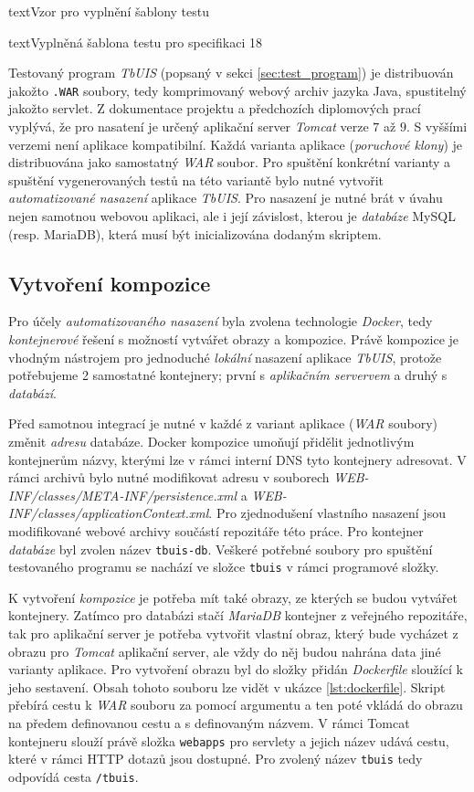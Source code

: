\documentclass[czech, ma, kiv, he, iso690numb, pdf, viewonly]{fasthesis}
\begin{document}
\begin{code}{text}{Vzor pro vyplnění šablony testu \label{lst:template}}
{\begin{code}{text}{Vyplněná šablona testu pro specifikaci 18 \label{lst:spec18}}
{    %
    Testovaný program \textit{TbUIS} (popsaný v sekci \ref{sec:test_program}) je distribuován jakožto \verb|.WAR| soubory, tedy komprimovaný webový archiv jazyka Java, spustitelný jakožto \gls{servlet}. Z dokumentace projektu a předchozích diplomových prací vyplývá, že pro nasatení je určený aplikační server \textit{Tomcat} verze \(7\) až \(9\). S vyššími verzemi není aplikace kompatibilní. Každá varianta aplikace (\textit{poruchové klony}) je distribuována jako samostatný \textit{WAR} soubor. Pro spuštění konkrétní varianty a spuštění vygenerovaných testů na této variantě bylo nutné vytvořit \textit{automatizované nasazení} aplikace \textit{TbUIS}. Pro nasazení je nutné brát v úvahu nejen samotnou webovou aplikaci, ale i její závislost, kterou je \textit{databáze} MySQL (resp. MariaDB), která musí být inicializována dodaným skriptem.

    \subsection{Vytvoření kompozice} \label{sec:composition}
    Pro účely \textit{automatizovaného nasazení} byla zvolena technologie \textit{Docker}, tedy \textit{kontejnerové} řešení s možností vytvářet obrazy a kompozice. Právě kompozice je vhodným nástrojem pro jednoduché \textit{lokální} nasazení aplikace \textit{TbUIS}, protože potřebujeme 2 samostatné kontejnery; první s \textit{aplikačním servervem} a druhý s \textit{databází}.

    Před samotnou integrací je nutné v každé z variant aplikace (\textit{WAR} soubory) změnit \textit{adresu} databáze. Docker kompozice umoňují přidělit jednotlivým kontejnerům názvy, kterými lze v rámci interní DNS tyto kontejnery adresovat. V rámci archivů bylo nutné modifikovat adresu v souborech \textit{WEB-INF/classes/META-INF/persistence.xml} a \textit{WEB-INF/classes/applicationContext.xml}. Pro zjednodušení vlastního nasazení jsou modifikované webové archivy součástí repozitáře této práce. Pro kontejner \textit{databáze} byl zvolen název \verb|tbuis-db|. Veškeré potřebné soubory pro spuštění testovaného programu se nachází ve složce \verb|tbuis| v rámci programové složky.

    K vytvoření \textit{kompozice} je potřeba mít také obrazy, ze kterých se budou vytvářet kontejnery. Zatímco pro databázi stačí \textit{MariaDB} kontejner z veřejného repozitáře, tak pro aplikační server je potřeba vytvořit vlastní obraz, který bude vycházet z obrazu pro \textit{Tomcat} aplikační server, ale vždy do něj budou nahrána data jiné varianty aplikace. Pro vytvoření obrazu byl do složky přidán \textit{Dockerfile} sloužící k jeho sestavení. Obsah tohoto souboru lze vidět v ukázce \ref{lst:dockerfile}. Skript přebírá cestu k \textit{WAR} souboru za pomocí argumentu a ten poté vkládá do obrazu na předem definovanou cestu a s definovaným názvem. V rámci Tomcat kontejneru slouží právě složka \verb|webapps| pro servlety a jejich název udává cestu, které v rámci HTTP dotazů jsou dostupné. Pro zvolený název \verb|tbuis| tedy odpovídá cesta \verb|/tbuis|.

}
\end{code}}
\end{code}
\end{document}
